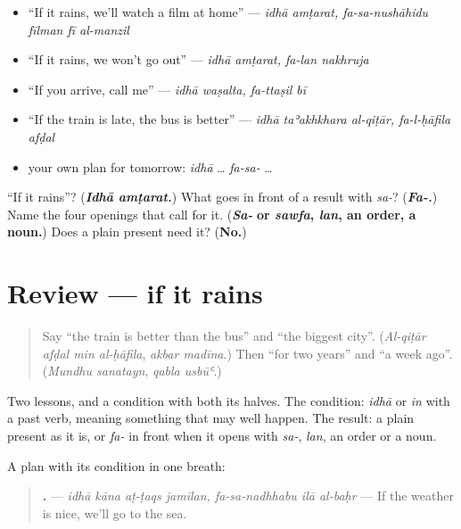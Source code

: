 \begin{itemize}
\raggedright
  \item \textquotedblleft{}If it rains, we'll watch a film at home\textquotedblright{} — \emph{idhā amṭarat, fa-sa-nushāhidu fīlman fī al-manzil}
  \item \textquotedblleft{}If it rains, we won't go out\textquotedblright{} — \emph{idhā amṭarat, fa-lan nakhruja}
  \item \textquotedblleft{}If you arrive, call me\textquotedblright{} — \emph{idhā waṣalta, fa-ttaṣil bī}
  \item \textquotedblleft{}If the train is late, the bus is better\textquotedblright{} — \emph{idhā taʾakhkhara al-qiṭār, fa-l-ḥāfila afḍal}
  \item your own plan for tomorrow: \emph{idhā} … \emph{fa-sa-} …
\end{itemize}

\begin{tcolorbox}[breakable,colback=teal!4,colframe=teal!35!black,title={Before you move on}]
\textquotedblleft{}If it rains\textquotedblright{}? (\emph{\textbf{Idhā amṭarat.}}) What goes in front of a result with \emph{sa-}? (\emph{\textbf{Fa-.}}) Name the four openings that call for it. (\emph{\textbf{Sa-}} \textbf{or \emph{sawfa}, \emph{lan}, an order, a noun.}) Does a plain present need it? (\textbf{No.})
\end{tcolorbox}
\section[(review)]{Review — if it rains}

\label{lesson:AR-R291-if-it-rains}



\begin{quote}
Say \textquotedblleft{}the train is better than the bus\textquotedblright{} and \textquotedblleft{}the biggest city\textquotedblright{}. (\emph{Al-qiṭār afḍal min al-ḥāfila}, \emph{akbar madīna}.) Then \textquotedblleft{}for two years\textquotedblright{} and \textquotedblleft{}a week ago\textquotedblright{}. (\emph{Mundhu sanatayn}, \emph{qabla usbūʿ}.)
\end{quote}

\begin{grammarlens}[title={What you've built}]
Two lessons, and a condition with both its halves. The condition: \emph{idhā} or \emph{in} with a past verb, meaning something that may well happen. The result: a plain present as it is, or \emph{fa-} in front when it opens with \emph{sa-}, \emph{lan}, an order or a noun.

A plan with its condition in one breath:

\begin{quote}
\textbf{      .} — \emph{idhā kāna aṭ-ṭaqs jamīlan, fa-sa-nadhhabu ilā al-baḥr} — If the weather is nice, we'll go to the sea.
\end{quote}
\end{grammarlens}

